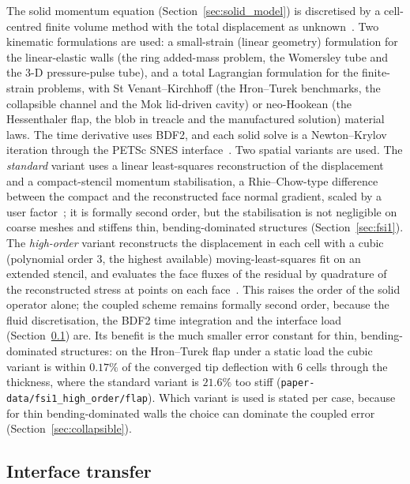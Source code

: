 The solid momentum equation (Section~\ref{sec:solid_model}) is discretised by a cell-centred finite volume method with the total displacement as unknown~\citep{Jasak2000, Cardiff2021}.
Two kinematic formulations are used: a small-strain (linear geometry) formulation for the linear-elastic walls (the ring added-mass problem, the Womersley tube and the 3-D pressure-pulse tube), and a total Lagrangian formulation for the finite-strain problems, with St Venant--Kirchhoff (the Hron--Turek benchmarks, the collapsible channel and the Mok lid-driven cavity) or neo-Hookean (the Hessenthaler flap, the blob in treacle and the manufactured solution) material laws.
The time derivative uses BDF2, and each solid solve is a Newton--Krylov iteration through the PETSc SNES interface~\citep{PETSc, Cardiff2026}.
Two spatial variants are used.
The \emph{standard} variant uses a linear least-squares reconstruction of the displacement and a compact-stencil momentum stabilisation, a Rhie--Chow-type difference between the compact and the reconstructed face normal gradient, scaled by a user factor~\citep{Cardiff2026}; it is formally second order, but the stabilisation is not negligible on coarse meshes and stiffens thin, bending-dominated structures (Section~\ref{sec:fsi1}).
The \emph{high-order} variant reconstructs the displacement in each cell with a cubic (polynomial order 3, the highest available) moving-least-squares fit on an extended stencil, and evaluates the face fluxes of the residual by quadrature of the reconstructed stress at points on each face~\citep{Batistic2026}.
This raises the order of the solid operator alone; the coupled scheme remains formally second order, because the fluid discretisation, the BDF2 time integration and the interface load (Section~\ref{sec:interface_transfer}) are.
Its benefit is the much smaller error constant for thin, bending-dominated structures: on the Hron--Turek flap under a static load the cubic variant is within $0.17\%$ of the converged tip deflection with 6 cells through the thickness, where the standard variant is $21.6\%$ too stiff (\texttt{paper-data/fsi1\_high\_order/flap}).
Which variant is used is stated per case, because for thin bending-dominated walls the choice can dominate the coupled error (Section~\ref{sec:collapsible}).

\subsection{Interface transfer}\label{sec:interface_transfer}

